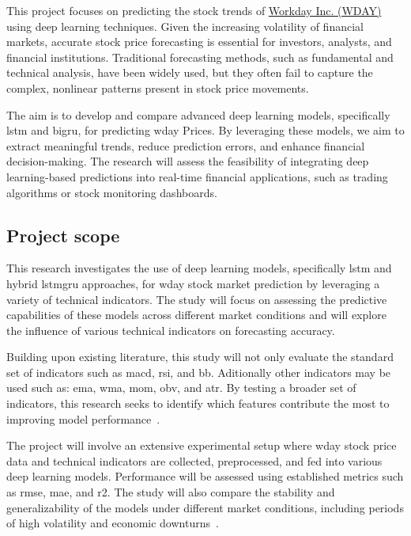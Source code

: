 This project focuses on predicting the stock trends of 
\href{https://www.nasdaq.com/market-activity/stocks/wday}{Workday Inc. (WDAY)} using deep learning techniques. 
Given the increasing volatility of financial markets, accurate stock price forecasting is essential for
investors, analysts, and financial institutions. Traditional forecasting methods, such as fundamental and
technical analysis, have been widely used, but they often fail to capture the complex, nonlinear patterns 
present in stock price movements.

The aim is to develop and compare advanced deep learning models, specifically \acrfull{lstm} 
and \acrfull{bigru}, for predicting \acrfull{wday} Prices. By leveraging these models, we aim to extract meaningful
trends, reduce prediction errors, and enhance financial decision-making. The research will assess the feasibility
of integrating deep learning-based predictions into real-time financial applications, such as trading algorithms
or stock monitoring dashboards.

\subsection{Project scope}

This research investigates the use of deep learning models, specifically \acrshort{lstm} and hybrid 
\acrfull{lstmgru} approaches, for \acrshort{wday} stock market prediction by leveraging a variety of technical
indicators. The study will focus on assessing the predictive capabilities of these models across different market
conditions and will explore the influence of various technical indicators on forecasting accuracy.

Building upon existing literature, this study will not only evaluate the standard set of indicators such as 
\acrfull{macd}, \acrfull{rsi}, and \acrfull{bb}. Aditionally other indicators may be used such as: 
\acrfull{ema}, \acrfull{wma}, \acrfull{mom}, \acrfull{obv}, and \acrfull{atr}. By testing a broader set of
indicators, this research seeks to identify which features contribute the most to improving model 
performance~\parencite{parmar2018stock, nabipour2020DeepLearning}.

The project will involve an extensive experimental setup where \acrshort{wday} stock price data and technical indicators 
are collected, preprocessed, and fed into various deep learning models. Performance will be assessed using 
established metrics such as \acrfull{rmse}, \acrfull{mae}, and \acrfull{r2}. The study will also compare the 
stability and generalizability of the models under different market conditions, including periods of high
volatility and economic downturns~\parencite{chang2024StockPrediction, phuoc2024StockPrediction}.

